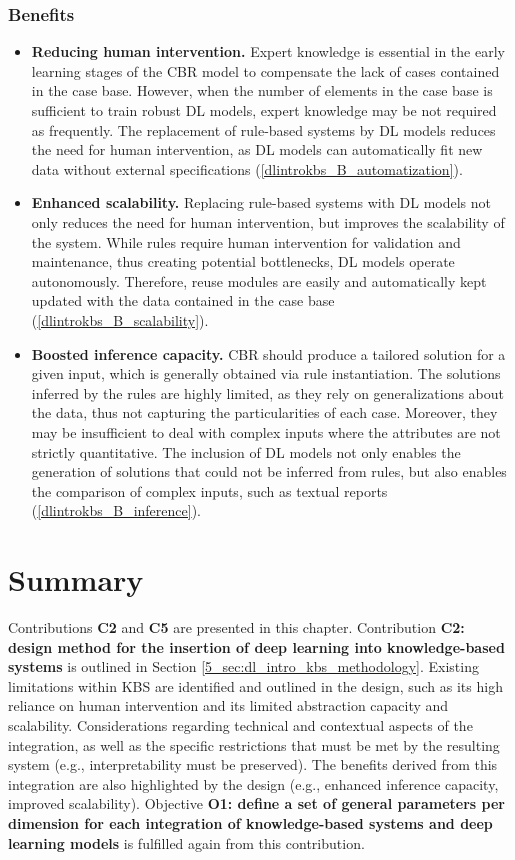 \subsubsection*{Benefits}
\begin{itemize}
    \item \textbf{Reducing human intervention.} Expert knowledge is essential in the early learning stages of the CBR model to compensate the lack of cases contained in the case base. However, when the number of elements in the case base is sufficient to train robust DL models, expert knowledge may be not required as frequently. The replacement of rule-based systems by DL models reduces the need for human intervention, as DL models can automatically fit new data without external specifications (\ref{dlintrokbs_B_automatization}).
    
    \item \textbf{Enhanced scalability.} Replacing rule-based systems with DL models not only reduces the need for human intervention, but improves the scalability of the system. While rules require human intervention for validation and maintenance, thus creating potential bottlenecks, DL models operate autonomously. Therefore, reuse modules are easily and automatically kept updated with the data contained in the case base (\ref{dlintrokbs_B_scalability}).
    
    \item \textbf{Boosted inference capacity.} CBR should produce a tailored solution for a given input, which is generally obtained via rule instantiation. The solutions inferred by the rules are highly limited, as they rely on generalizations about the data, thus not capturing the particularities of each case. Moreover, they may be insufficient to deal with complex inputs where the attributes are not strictly quantitative. The inclusion of DL models not only enables the generation of solutions that could not be inferred from rules, but also enables the comparison of complex inputs, such as textual reports (\ref{dlintrokbs_B_inference}).
\end{itemize}

\section{Summary}\label{5_sec:summary}
Contributions \textbf{C2} and \textbf{C5} are presented in this chapter. Contribution \textbf{C2: design method for the insertion of deep learning into knowledge-based systems} is outlined in Section \ref{5_sec:dl_intro_kbs_methodology}. Existing limitations within KBS are identified and outlined in the design, such as its high reliance on human intervention and its limited abstraction capacity and scalability. Considerations regarding technical and contextual aspects of the integration, as well as the specific restrictions that must be met by the resulting system (e.g., interpretability must be preserved). The benefits derived from this integration are also highlighted by the design (e.g., enhanced inference capacity, improved scalability). Objective \textbf{O1: define a set of general parameters per dimension for each integration of knowledge-based systems and deep learning models} is fulfilled again from this contribution.

